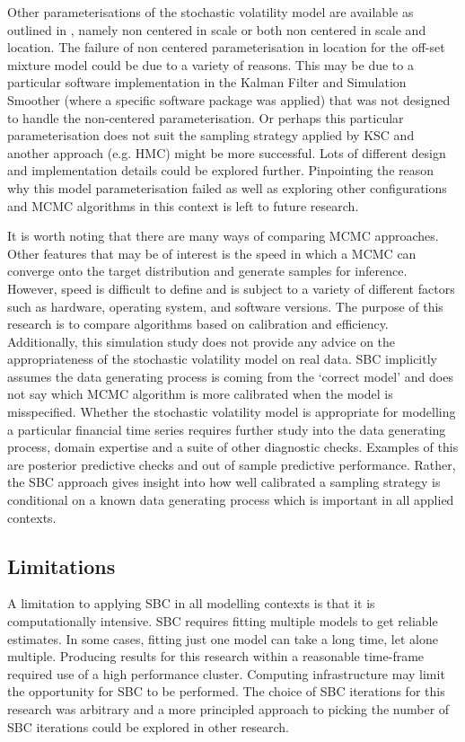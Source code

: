 \documentclass[12pt, a4paper]{article}
\begin{document}
Other parameterisations of the stochastic volatility model are available as outlined in \citet{strickland2008parameterisation}, namely non centered in scale or both non centered in scale and location. The failure of non centered parameterisation in location for the off-set mixture model could be due to a variety of reasons. This may be due to a particular software implementation in the Kalman Filter and Simulation Smoother (where a specific software package was applied) that was not designed to handle the non-centered parameterisation. Or perhaps this particular parameterisation does not suit the sampling strategy applied by KSC and another approach (e.g. HMC) might be more successful. Lots of different design and implementation details could be explored further. Pinpointing the reason why this model parameterisation failed as well as exploring other configurations and MCMC algorithms in this context is left to future research.

It is worth noting that there are many ways of comparing MCMC approaches. Other features that may be of interest is the speed in which a MCMC can converge onto the target distribution and generate samples for inference. However, speed is difficult to define and is subject to a variety of different factors such as hardware, operating system, and software versions. The purpose of this research is to compare algorithms based on calibration and efficiency. Additionally, this simulation study does not provide any advice on the appropriateness of the stochastic volatility model on real data. SBC implicitly assumes the data generating process is coming from the `correct model' and does not say which MCMC algorithm is more calibrated when the model is misspecified. Whether the stochastic volatility model is appropriate for modelling a particular financial time series requires further study into the data generating process, domain expertise and a suite of other diagnostic checks. Examples of this are posterior predictive checks and out of sample predictive performance. Rather, the SBC approach gives insight into how well calibrated a sampling strategy is conditional on a known data generating process which is important in all applied contexts.  


\subsection{Limitations}
A limitation to applying SBC in all modelling contexts is that it is computationally intensive. SBC requires fitting multiple models to get reliable estimates. In some cases, fitting just one model can take a long time, let alone multiple. Producing results for this research within a reasonable time-frame required use of a high performance cluster. Computing infrastructure may limit the opportunity for SBC to be performed. The choice of SBC iterations for this research was arbitrary and a more principled approach to picking the number of SBC iterations could be explored in other research.
\end{document}
